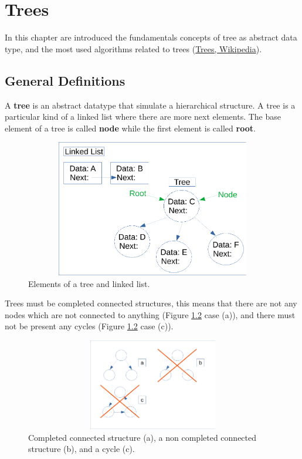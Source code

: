 \setchapterpreamble[u]{\margintoc}
\chapter{Trees}
In this chapter are introduced the fundamentals concepts of tree as abstract data type, and the most used algorithms related to trees \cite{wikitrees} (\href{https://en.wikipedia.org/wiki/Tree_(data_structure)}{Trees, Wikipedia}).

\section{General Definitions}
A \textbf{tree} is an abstract datatype that simulate a hierarchical structure. A tree is a particular kind of a linked list where there are more next elements. The base element of a tree is called \textbf{node} while the first element is called \textbf{root}.

\begin{figure}[hb]
	\includegraphics[width=14cm,height=6cm]{chapters/trees/images/trees_1.pdf}
	\caption[]{Elements of a tree and linked list.}
	\label{trees_1}
\end{figure}

Trees must be completed connected structures, this means that there are not any nodes which are not connected to anything (Figure \ref{trees_2} case (a)), and there must not be present any cycles (Figure \ref{trees_2} case (c)).

\begin{figure}[hb]
	\includegraphics[width=12cm,height=4cm]{chapters/trees/images/trees_2.pdf}
	\caption[]{Completed connected structure (a), a non completed connected structure (b), and a cycle (c).}
	\label{trees_2}
\end{figure}

